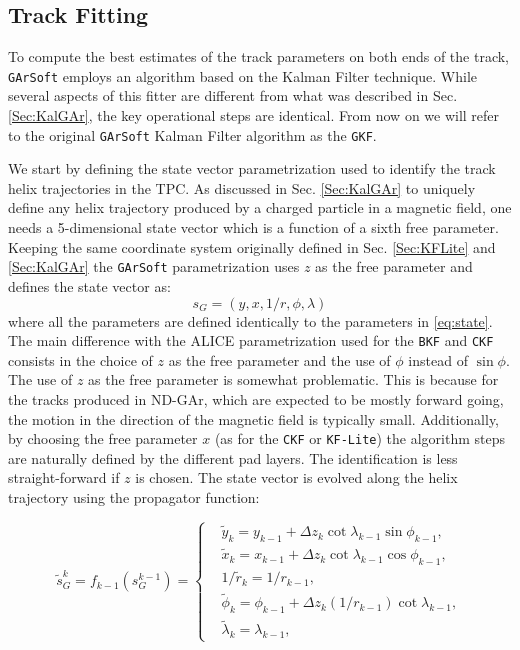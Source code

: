 \subsection{Track Fitting}
\label{Sec:GArSoft_Fit}
To compute the best estimates of the track parameters on both ends of the track, \texttt{GArSoft} employs an algorithm based on the Kalman Filter technique. While several aspects of this fitter are different from what was described in Sec. \ref{Sec:KalGAr}, the key operational steps are identical. From now on we will refer to the original \texttt{GArSoft} Kalman Filter algorithm as the \texttt{GKF}.

We start by defining the state vector parametrization used to identify the track helix trajectories in the TPC. As discussed in Sec. \ref{Sec:KalGAr} to uniquely define any helix trajectory produced by a charged particle in a magnetic field, one needs a 5-dimensional state vector which is a function of a sixth free parameter. Keeping the same coordinate system originally defined in Sec. \ref{Sec:KFLite} and \ref{Sec:KalGAr} the \texttt{GArSoft} parametrization uses $z$ as the free parameter and defines the state vector as:
\begin{equation}
    s_G = (y,x,1/r,\phi,\lambda)
\end{equation}
where all the parameters are defined identically to the parameters in \ref{eq:state}. The main difference with the ALICE parametrization used for the \texttt{BKF} and \texttt{CKF} consists in the choice of $z$ as the free parameter and the use of $\phi$ instead of $\sin{\phi}$. The use of $z$ as the free parameter is somewhat problematic. This is because for the tracks produced in ND-GAr, which are expected to be mostly forward going, the motion in the direction of the magnetic field is typically small. Additionally, by choosing the free parameter $x$ (as for the \texttt{CKF} or \texttt{KF-Lite}) the algorithm steps are naturally defined by the different pad layers. The identification is less straight-forward if $z$ is chosen. The state vector is evolved along the helix trajectory using the propagator function:

\begin{equation} \label{eq:funcGAr}
    \widetilde{s}_G^k = f_{k-1}(s_G^{k-1}) =
        \left\{
        	\begin{aligned}
        		& \widetilde{y}_k  =  y_{k-1}+  \Delta z_k\cot{\lambda_{k-1}}\sin{\phi_{k-1}},  \\
        		& \widetilde{x}_k  =  x_{k-1}+\Delta z_k\cot{\lambda_{k-1}}\cos{\phi_{k-1}} ,\\ 
                    & 1/\widetilde{r}_k =  1/r_{k-1},  \\               
                    & \widetilde{\phi}_k   =  \phi_{k-1}+\Delta z_k(1/r_{k-1})\cot\lambda_{k-1}, \\   
                    & \widetilde{\lambda}_k = \lambda_{k-1},
        	\end{aligned}
        \right.
\end{equation}


